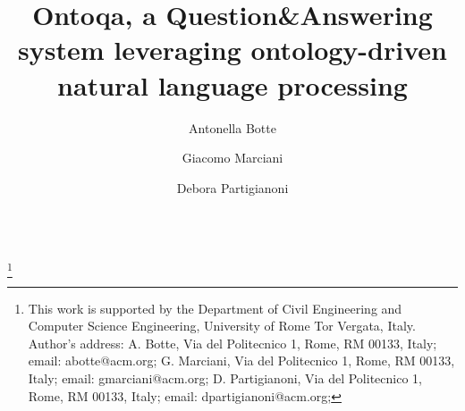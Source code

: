 \documentclass[acmlarge,10pt]{acmart}
\numberwithin{equation}{section}
\begin{document}
\title{Ontoqa, a Question\&Answering system leveraging ontology-driven natural language processing}
\author{Antonella Botte}
\author{Giacomo Marciani}
\author{Debora Partigianoni}

$  $


\thanks{
  This work is supported by the Department of Civil Engineering and Computer Science
  Engineering, University of Rome Tor Vergata, Italy.\\
  Author's address:
  A. Botte, Via del Politecnico 1, Rome, RM 00133, Italy;
  email: abotte@acm.org;
  G. Marciani, Via del Politecnico 1, Rome, RM 00133, Italy;
  email: gmarciani@acm.org;
  D. Partigianoni, Via del Politecnico 1, Rome, RM 00133, Italy;
  email: dpartigianoni@acm.org;
}

\maketitle

\renewcommand{\shortauthors}{A. Botte, G. Marciani and D. Partigianoni}
















\end{document}
